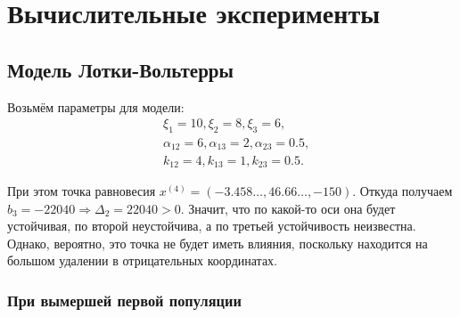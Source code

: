 \section{Вычислительные эксперименты}
    \subsection{Модель Лотки-Вольтерры}
    Возьмём параметры для модели:
    \[
        \begin{split}
            & \xi_1 = 10, \xi_2 = 8, \xi_3 = 6, \\
            & \alpha_{12} = 6, \alpha_{13} = 2, \alpha_{23} = 0.5, \\
            & k_{12} = 4, k_{13} = 1, k_{23} = 0.5.
        \end{split}
    \]

    При этом точка равновесия \( x^{(4)} = ( -3.458\dots, 46.66\dots, -150 ) \). Откуда получаем \( b_3 = -22040 \Rightarrow \Delta_2 = 22040 > 0 \). Значит, что по какой-то оси она будет устойчивая, по второй неустойчива, а по третьей устойчивость неизвестна. Однако, вероятно, это точка не будет иметь влияния, поскольку находится на большом удалении в отрицательных координатах.

    \subsubsection{При вымершей первой популяции}

